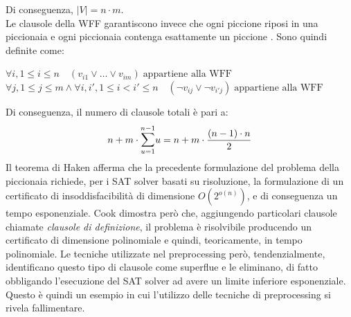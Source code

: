 Di conseguenza, $|V| = n \cdot m$.\\
Le clausole della WFF garantiscono invece che ogni piccione riposi in una piccionaia e ogni piccionaia contenga esattamente un piccione \cite{php-cook}.
Sono quindi definite come:
\begin{center}
    $\forall i, 1 \le i \le n \quad (v_{i1} \lor \ldots \lor v_{im}) \; \textrm{appartiene alla WFF}$
    $\forall j, 1 \le j \le m \land \forall i, i', 1 \le i < i' \le n \quad (\lnot v_{ij} \lor \lnot v_{i'j}) \; \textrm{appartiene alla WFF}$
\end{center}
Di conseguenza, il numero di clausole totali è pari a: 
\begin{equation*}
    n + m \cdot \mathlarger{\sum}\limits_{u = 1}^{n-1} u = n + m \cdot \frac{(n - 1) \cdot n}{2}
\end{equation*}
Il teorema di Haken \cite{php-haken} afferma che la precedente formulazione del problema della piccionaia richiede, per i SAT solver
basati su risoluzione, la formulazione di un certificato di insoddisfacibilità di dimensione $O(2^{o(n)})$,
e di conseguenza un tempo esponenziale.
Cook \cite{php-cook} dimostra però che, aggiungendo particolari clausole chiamate \textit{clausole di definizione}, il problema è
risolvibile producendo un certificato di dimensione polinomiale e quindi, teoricamente,
in tempo polinomiale.
Le tecniche utilizzate nel preprocessing 
però, tendenzialmente, identificano questo tipo di clausole come superflue e 
le eliminano, di fatto obbligando l'esecuzione del SAT solver ad avere un limite inferiore esponenziale.\\
Questo è quindi un esempio in cui l'utilizzo delle tecniche di preprocessing si rivela fallimentare.

